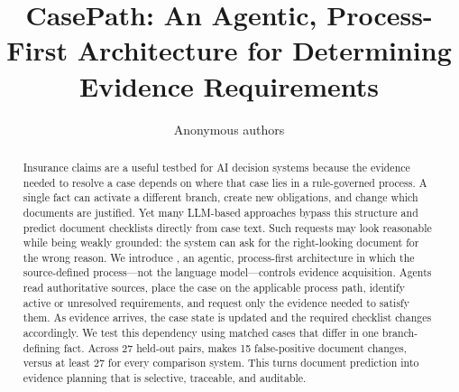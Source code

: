 \title{CasePath: An Agentic, Process-First Architecture for Determining Evidence Requirements}
\author{Anonymous authors}
\maketitle

\begin{abstract}
Insurance claims are a useful testbed for AI decision systems because the evidence needed to resolve a case depends on where that case lies in a rule-governed process. A single fact can activate a different branch, create new obligations, and change which documents are justified. Yet many LLM-based approaches bypass this structure and predict document checklists directly from case text. Such requests may look reasonable while being weakly grounded: the system can ask for the right-looking document for the wrong reason. We introduce \casepath, an agentic, process-first architecture in which the source-defined process—not the language model—controls evidence acquisition. Agents read authoritative sources, place the case on the applicable process path, identify active or unresolved requirements, and request only the evidence needed to satisfy them. As evidence arrives, the case state is updated and the required checklist changes accordingly. We test this dependency using matched cases that differ in one branch-defining fact. Across 27 held-out pairs, \casepath makes 15 false-positive document changes, versus at least 27 for every comparison system. This turns document prediction into evidence planning that is selective, traceable, and auditable. \end{abstract}
